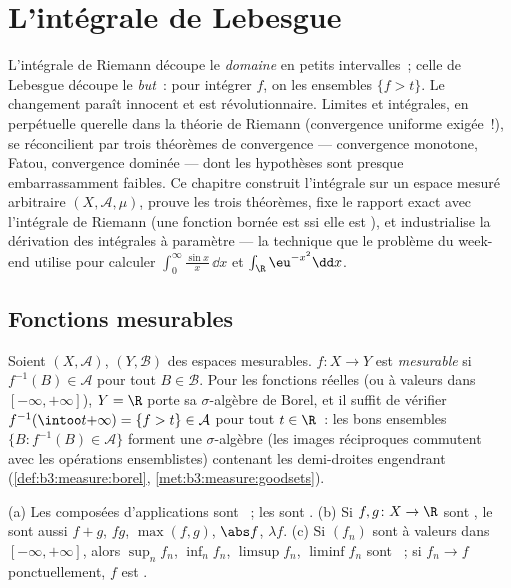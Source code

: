 \chapter{L'intégrale de Lebesgue}\label{ch:b3:lebesgue}

L'intégrale de Riemann découpe le \emph{domaine} en petits
intervalles~; celle de Lebesgue découpe le \emph{but}~: pour
intégrer $f$, on  les ensembles $\{f > t\}$. Le
changement paraît innocent et est révolutionnaire. Limites et
intégrales, en perpétuelle querelle dans la théorie de Riemann
(convergence uniforme exigée~!), se réconcilient par trois
théorèmes de convergence --- convergence monotone, Fatou,
convergence dominée --- dont les hypothèses sont presque
embarrassamment faibles. Ce chapitre construit l'intégrale sur
un espace mesuré arbitraire $(X, \mathcal A, \mu)$, prouve les
trois théorèmes, fixe le rapport exact avec l'intégrale de
Riemann (une fonction bornée est  ssi elle
est  ), et industrialise la
dérivation des intégrales à paramètre --- la technique que le
problème du week-end utilise pour calculer
$\int_0^\infty\frac{\sin x}x\,\dd x$ et $\int_\R
\eu^{-x^2}\dd x$.

\section{Fonctions mesurables}

\begin{definition}\label{def:b3:lebesgue:measurable}
Soient $(X, \mathcal A)$, $(Y, \mathcal B)$ des espaces
mesurables. $f \colon X \to Y$ est
\emph{mesurable} si $f^{-1}(B)
\in \mathcal A$ pour tout $B \in \mathcal B$. Pour les
fonctions réelles (ou à valeurs dans $[-\infty,+\infty]$), $Y
= \R$ porte sa $\sigma$-algèbre de Borel, et il suffit de
vérifier $f^{-1}(\intoo t{+\infty}) = \{f > t\} \in \mathcal
A$ pour tout $t \in \R$~: les bons ensembles $\{B :
f^{-1}(B) \in \mathcal A\}$ forment une $\sigma$-algèbre
(les images réciproques commutent avec les opérations
ensemblistes) contenant les demi-droites engendrant
(\cref{def:b3:measure:borel},
\cref{met:b3:measure:goodsets}).
\end{definition}

\begin{proposition}\label{prop:b3:lebesgue:stability}
(a) Les composées d'applications  sont ~;
les  sont .
(b) Si $f, g \colon X \to \R$ sont , le sont aussi
$f + g$, $fg$, $\max(f,g)$, $\abs f$, $\lambda f$.
(c) Si $(f_n)$ sont  à valeurs dans
$[-\infty, +\infty]$, alors $\sup_nf_n$, $\inf_nf_n$,
$\limsup f_n$, $\liminf f_n$ sont ~; si $f_n \to f$
ponctuellement, $f$ est .
\end{proposition}

